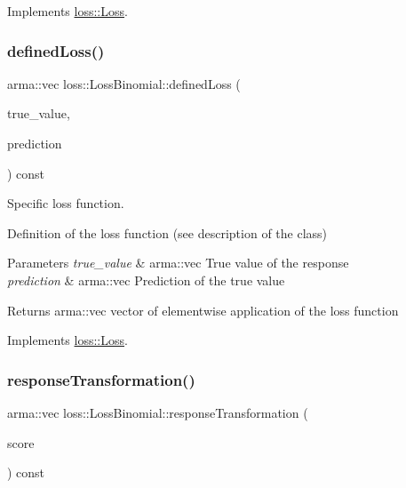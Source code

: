 Implements \mbox{\hyperlink{classloss_1_1_loss_a267a4de70747ade4b2d84ce35a448979}{loss\+::\+Loss}}.

\mbox{\label{classloss_1_1_loss_binomial_a396a06f762b735f83af21bdd4ba8fe9c}} 
\subsubsection{\texorpdfstring{defined\+Loss()}{definedLoss()}}
{\footnotesize\ttfamily arma\+::vec loss\+::\+Loss\+Binomial\+::defined\+Loss (\begin{DoxyParamCaption}\item[{const arma\+::vec \&}]{true\+\_\+value,  }\item[{const arma\+::vec \&}]{prediction }\end{DoxyParamCaption}) const\hspace{0.3cm}{\ttfamily [virtual]}}



Specific loss function. 

Definition of the loss function (see description of the class)


\begin{DoxyParams}{Parameters}
{\em true\+\_\+value} & {\ttfamily arma\+::vec} True value of the response \\
\hline
{\em prediction} & {\ttfamily arma\+::vec} Prediction of the true value\\
\hline
\end{DoxyParams}
\begin{DoxyReturn}{Returns}
{\ttfamily arma\+::vec} vector of elementwise application of the loss function 
\end{DoxyReturn}


Implements \mbox{\hyperlink{classloss_1_1_loss_ae9f94dd9b8311397583ba3a9cb485e94}{loss\+::\+Loss}}.

\mbox{\label{classloss_1_1_loss_binomial_a757fd8d478732ce94e8ba9497846bcf4}} 
\subsubsection{\texorpdfstring{response\+Transformation()}{responseTransformation()}}
{\footnotesize\ttfamily arma\+::vec loss\+::\+Loss\+Binomial\+::response\+Transformation (\begin{DoxyParamCaption}\item[{const arma\+::vec \&}]{score }\end{DoxyParamCaption}) const\hspace{0.3cm}{\ttfamily [virtual]}}



